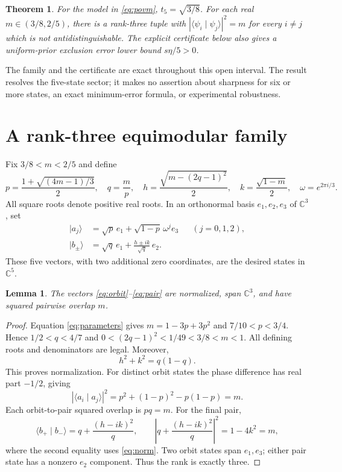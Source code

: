 \documentclass[11pt]{article}
\newtheorem{theorem}{Theorem}
\newtheorem{lemma}{Lemma}
\newcommand{\ket}[1]{\lvert #1\rangle}
\newcommand{\C}{\mathbb C}
\begin{document}
\begin{theorem}\label{thm:main}
For the model in \eqref{eq:povm}, $t_5=\sqrt{3/8}$.
For each real $m\in(3/8,2/5)$, there is a rank-three tuple with
$|\langle\psi_i\mid\psi_j\rangle|^2=m$ for every $i\neq j$
which is not antidistinguishable. The explicit certificate below
also gives a uniform-prior exclusion error lower bound $s\eta/5>0$.
\end{theorem}

The family and the certificate are exact throughout this open
interval. The result resolves the five-state sector; it makes no
assertion about sharpness for six or more states, an exact minimum-error
formula, or experimental robustness.

\section{A rank-three equimodular family}
Fix $3/8<m<2/5$ and define
\begin{equation}
 p=\frac{1+\sqrt{(4m-1)/3}}2,\quad q=\frac mp,\quad
 h=\frac{\sqrt{m-(2q-1)^2}}2,\quad
 k=\frac{\sqrt{1-m}}2,\quad \omega=e^{2\pi i/3}.
 \label{eq:parameters}
\end{equation}
All square roots denote positive real roots. In an orthonormal basis
$e_1,e_2,e_3$ of $\C^3$, set
\begin{align}
 \ket{a_j}&=\sqrt p\,e_1+\sqrt{1-p}\,\omega^j e_3
       &&(j=0,1,2),\label{eq:orbit}\\
 \ket{b_\pm}&=\sqrt q\,e_1+
                \frac{h\pm ik}{\sqrt q}\,e_2 .
       \label{eq:pair}
\end{align}
These five vectors, with two additional zero coordinates, are the
desired states in $\C^5$.

\begin{lemma}\label{lem:states}
The vectors \eqref{eq:orbit}--\eqref{eq:pair} are normalized,
span $\C^3$, and have squared pairwise overlap $m$.
\end{lemma}
\begin{proof}
Equation \eqref{eq:parameters} gives
$m=1-3p+3p^2$ and $7/10<p<3/4$. Hence
$1/2<q<4/7$ and
$0<(2q-1)^2<1/49<3/8<m<1$. All defining roots and
denominators are legal. Moreover,
\begin{equation}
 h^2+k^2=q(1-q).
 \label{eq:norm}
\end{equation}
This proves normalization. For distinct orbit states the phase
difference has real part $-1/2$, giving
\begin{equation}
 |\langle a_i\mid a_j\rangle|^2
   =p^2+(1-p)^2-p(1-p)=m.
\end{equation}
Each orbit-to-pair squared overlap is $pq=m$. For the final pair,
\begin{equation}
 \langle b_+\mid b_-\rangle=q+\frac{(h-ik)^2}{q},
 \qquad
 \left|q+\frac{(h-ik)^2}{q}\right|^2=1-4k^2=m,
 \label{eq:pair-overlap}
\end{equation}
where the second equality uses \eqref{eq:norm}.
Two orbit states span $e_1,e_3$; either pair state has a nonzero
$e_2$ component. Thus the rank is exactly three.
\end{proof}
\end{document}
